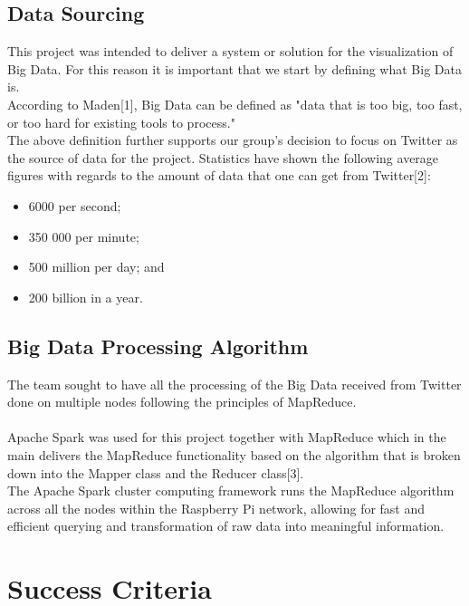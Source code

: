 \documentclass[12pt]{article} %
\begin{document}
	\subsection {Data Sourcing}
	
	This project was intended to deliver a system or solution for the visualization of Big Data. For this reason it is important that we start by defining what Big Data is.
	\\
	According to Maden[1], Big Data can be defined as "data that is too big, too fast, or too hard for existing tools to process."
	\\
	The above definition further supports our group's decision to focus on Twitter as the source of data for the project. Statistics have shown the following average figures with regards to the amount of data that one can get from Twitter[2]:
	\\
	
		\begin{itemize}
			\item 6000 per second; 
			\item 350 000 per minute;
			\item 500 million per day; and
			\item 200 billion in a year.
		\end{itemize}
	
	\subsection {Big Data Processing Algorithm}
	
	The team sought to have all the processing of the Big Data received from Twitter done on multiple nodes following the principles of MapReduce.
	\\
	\\
	Apache Spark was used for this project together with MapReduce which in the main delivers the MapReduce functionality based on the algorithm that is broken down into the Mapper class and the Reducer class[3].\\
	
	The Apache Spark cluster computing framework runs the MapReduce algorithm across all the nodes within the Raspberry Pi network, allowing for fast and efficient querying and transformation of raw data into meaningful information.
	
		\section{Success Criteria} %
		
\end{document}
